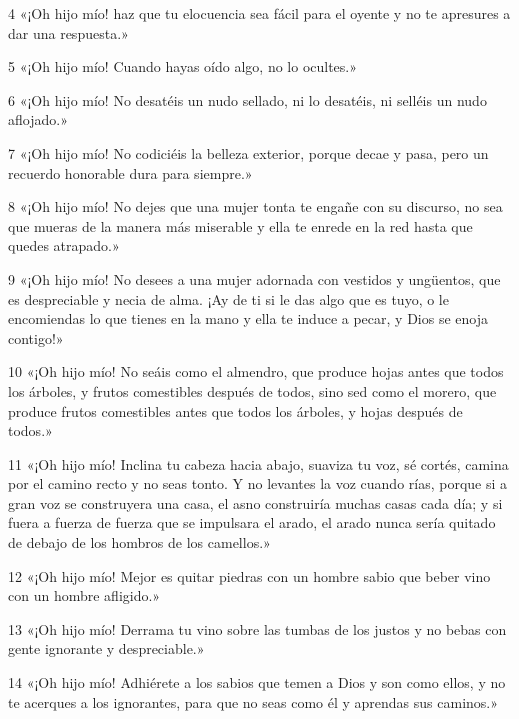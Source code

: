 \par 4 «¡Oh hijo mío! haz que tu elocuencia sea fácil para el oyente y no te apresures a dar una respuesta.»

\par 5 «¡Oh hijo mío! Cuando hayas oído algo, no lo ocultes.»

\par 6 «¡Oh hijo mío! No desatéis un nudo sellado, ni lo desatéis, ni selléis un nudo aflojado.»

\par 7 «¡Oh hijo mío! No codiciéis la belleza exterior, porque decae y pasa, pero un recuerdo honorable dura para siempre.»

\par 8 «¡Oh hijo mío! No dejes que una mujer tonta te engañe con su discurso, no sea que mueras de la manera más miserable y ella te enrede en la red hasta que quedes atrapado.»

\par 9 «¡Oh hijo mío! No desees a una mujer adornada con vestidos y ungüentos, que es despreciable y necia de alma. ¡Ay de ti si le das algo que es tuyo, o le encomiendas lo que tienes en la mano y ella te induce a pecar, y Dios se enoja contigo!»

\par 10 «¡Oh hijo mío! No seáis como el almendro, que produce hojas antes que todos los árboles, y frutos comestibles después de todos, sino sed como el morero, que produce frutos comestibles antes que todos los árboles, y hojas después de todos.»

\par 11 «¡Oh hijo mío! Inclina tu cabeza hacia abajo, suaviza tu voz, sé cortés, camina por el camino recto y no seas tonto. Y no levantes la voz cuando rías, porque si a gran voz se construyera una casa, el asno construiría muchas casas cada día; y si fuera a fuerza de fuerza que se impulsara el arado, el arado nunca sería quitado de debajo de los hombros de los camellos.»

\par 12 «¡Oh hijo mío! Mejor es quitar piedras con un hombre sabio que beber vino con un hombre afligido.»

\par 13 «¡Oh hijo mío! Derrama tu vino sobre las tumbas de los justos y no bebas con gente ignorante y despreciable.»

\par 14 «¡Oh hijo mío! Adhiérete a los sabios que temen a Dios y son como ellos, y no te acerques a los ignorantes, para que no seas como él y aprendas sus caminos.»

